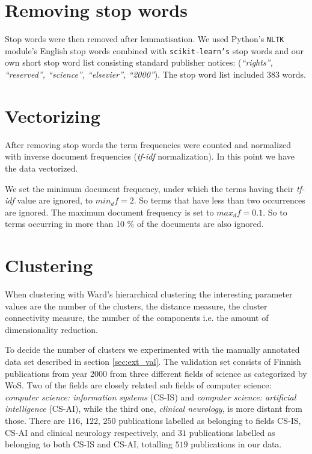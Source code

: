\section{Removing stop words}
Stop words were then removed after lemmatisation. We used Python's
\texttt{NLTK} module's English stop words combined with 
\texttt{scikit-learn's} stop words and our own short stop word 
list consisting standard publisher notices: (\emph{``rights'', 
``reserved'', ``science'', ``elsevier'', ``2000''}). The stop word 
list included $383$ words.


\section{Vectorizing}
After removing stop words the term frequencies were counted and 
normalized with inverse document frequencies (\emph{tf-idf} 
normalization). 
In this point we have the data vectorized.

We set the minimum document frequency, under which the terms 
having their \emph{tf-idf} value are ignored, to $min_df=2$. So 
terms that have less than two occurrences are ignored. The maximum 
document frequency is set to $max_df=0.1$. So to terms 
occurring in more than 10 \% of the documents are also ignored.



\section{Clustering}
When clustering with Ward's hierarchical clustering the 
interesting parameter values are the number of the clusters, 
the distance measure, the cluster connectivity measure, the 
number of the components i.e. the amount of dimensionality 
reduction. 

To decide the number of clusters we experimented with the manually 
annotated data set described in section \ref{sec:ext_val}.
The validation set consists of Finnish publications from year 2000
from three different fields of science as categorized by WoS.
Two of the fields are closely related sub fields of computer
science: \emph{computer science: information systems} (CS-IS) and 
\emph{computer science: 
artificial intelligence} (CS-AI), while the third one, 
\emph{clinical neurology}, is more distant from those. There are 
$116$, $122$, $250$ publications labelled as belonging to fields 
CS-IS, CS-AI and clinical neurology respectively, and $31$ 
publications labelled as belonging to both CS-IS and CS-AI, 
totalling $519$ publications in our data.

